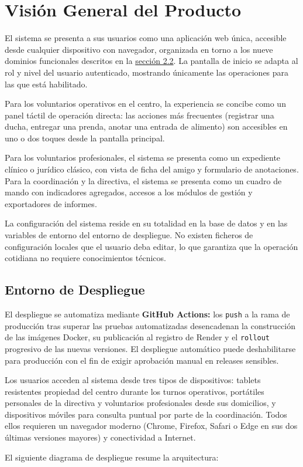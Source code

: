 \section{Visión General del Producto}
El sistema se presenta a sus usuarios como una aplicación web única,
accesible desde cualquier dispositivo con navegador, organizada en torno a
los nueve dominios funcionales descritos en la \hyperlink{section2.2}{sección 2.2}. La pantalla de inicio se
adapta al rol y nivel del usuario autenticado, mostrando únicamente las
operaciones para las que está habilitado.
\par
\vspace{5mm}
Para los voluntarios operativos en el centro, la experiencia se concibe como
un panel táctil de operación directa: las acciones más frecuentes (registrar
una ducha, entregar una prenda, anotar una entrada de alimento) son
accesibles en uno o dos toques desde la pantalla principal. 
\par
\vspace{5mm}
Para los voluntarios profesionales, el sistema se presenta como un expediente clínico
o jurídico clásico, con vista de ficha del amigo y formulario de
anotaciones. Para la coordinación y la directiva, el sistema se presenta
como un cuadro de mando con indicadores agregados, accesos a los módulos de
gestión y exportadores de informes.
\par
\vspace{5mm}
La configuración del sistema reside en su totalidad en la base de datos y en
las variables de entorno del entorno de despliegue. No existen ficheros de
configuración locales que el usuario deba editar, lo que garantiza que la
operación cotidiana no requiere conocimientos técnicos.


\subsection{Entorno de Despliegue}
El despliegue se automatiza mediante \textbf{GitHub Actions:} los \texttt{push} a la rama
de producción tras superar las pruebas automatizadas desencadenan la
construcción de las imágenes Docker, su publicación al registro de Render
y el \texttt{rollout} progresivo de las nuevas versiones. El despliegue automático
puede deshabilitarse para producción con el fin de exigir aprobación manual
en releases sensibles.
\par
\vspace{5mm}
Los usuarios acceden al sistema desde tres tipos de dispositivos: tablets
resistentes propiedad del centro durante los turnos operativos, portátiles
personales de la directiva y voluntarios profesionales desde sus
domicilios, y dispositivos móviles para consulta puntual por parte de la
coordinación. Todos ellos requieren un navegador moderno (Chrome, Firefox,
Safari o Edge en sus dos últimas versiones mayores) y conectividad a
Internet.
\par
\vspace{5mm}
El siguiente diagrama de despliegue resume la arquitectura:

